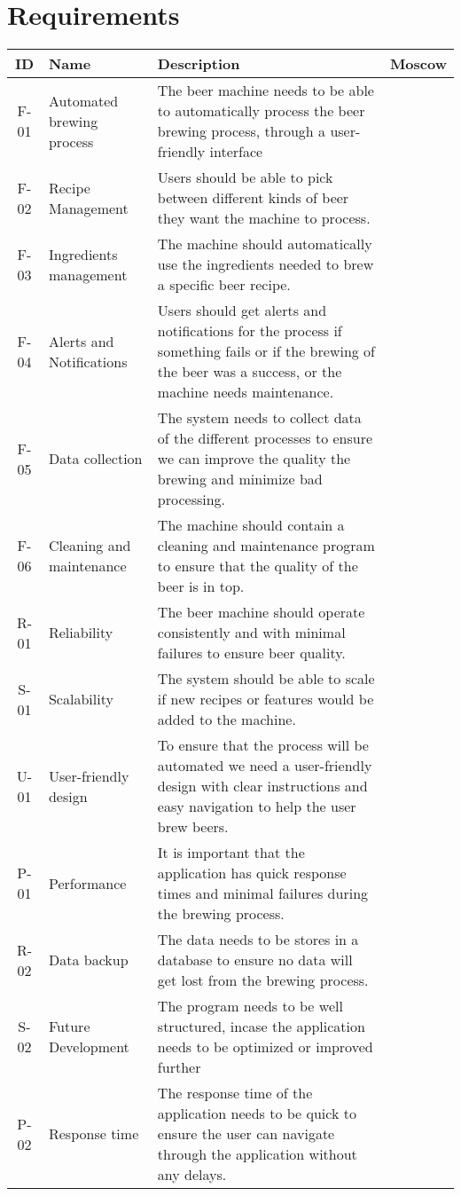 
\section{Requirements}



\begin{center}
    \sloppy
    \begin{longtable}{|c|p{3.5cm}|p{7cm}|c|}
        \hline
        ID & Name & Description & Moscow \\ \hline
        F-01   & Automated brewing process & The beer machine needs to be able to automatically process the beer brewing process, through a user-friendly interface &  \\ \hline
        F-02   & Recipe Management & Users should be able to pick between different kinds of beer they want the machine to process. &  \\ \hline
        F-03   & Ingredients management & The machine should automatically use the ingredients needed to brew a specific beer recipe. &  \\ \hline
        F-04   & Alerts and Notifications & Users should get alerts and notifications for the process if something fails or if the brewing of the beer was a success, or the machine needs maintenance. &  \\ \hline
        F-05  & Data collection & The system needs to collect data of the different processes to ensure we can improve the quality the brewing and minimize bad processing. &  \\ \hline
        F-06   & Cleaning and maintenance & The machine should contain a cleaning and maintenance program to ensure that the quality of the beer is in top.&  \\ \hline
        R-01   & Reliability & The beer machine should operate consistently and with minimal failures to ensure beer quality. &  \\ \hline
        S-01   & Scalability & The system should be able to scale if new recipes or features would be added to the machine. &  \\ \hline
        U-01  & User-friendly design & To ensure that the process will be automated we need a user-friendly design with clear instructions and easy navigation to help the user brew beers. &  \\ \hline
        P-01   & Performance & It is important that the application has quick response times and minimal failures during the brewing process. &  \\ \hline
        R-02  & Data backup & The data needs to be stores in a database to ensure no data will get lost from the brewing process. &  \\ \hline
        S-02   & Future Development & The program needs to be well structured, incase the application needs to be optimized or improved further &  \\ \hline
        P-02   & Response time & The response time of the application needs to be quick to ensure the user can navigate through the application without any delays. &  \\ \hline


\end{longtable}
\end{center}
